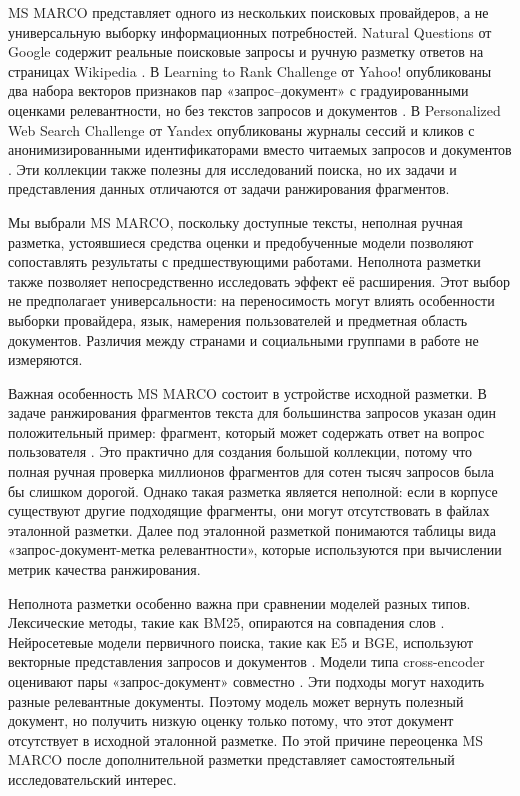 \documentclass[runningheads,a4paper]{llncs}
\begin{document}
MS MARCO представляет одного из нескольких поисковых провайдеров, а не универсальную выборку информационных потребностей. Natural Questions от Google содержит реальные поисковые запросы и ручную разметку ответов на страницах Wikipedia \cite{kwiatkowski2019naturalquestions}. В Learning to Rank Challenge от Yahoo! опубликованы два набора векторов признаков пар «запрос--документ» с градуированными оценками релевантности, но без текстов запросов и документов \cite{chapelle2011yahoo}. В Personalized Web Search Challenge от Yandex опубликованы журналы сессий и кликов с анонимизированными идентификаторами вместо читаемых запросов и документов \cite{yandex2013personalized}. Эти коллекции также полезны для исследований поиска, но их задачи и представления данных отличаются от задачи ранжирования фрагментов.

Мы выбрали MS MARCO, поскольку доступные тексты, неполная ручная разметка, устоявшиеся средства оценки и предобученные модели позволяют сопоставлять результаты с предшествующими работами. Неполнота разметки также позволяет непосредственно исследовать эффект её расширения. Этот выбор не предполагает универсальности: на переносимость могут влиять особенности выборки провайдера, язык, намерения пользователей и предметная область документов. Различия между странами и социальными группами в работе не измеряются.

Важная особенность MS MARCO состоит в устройстве исходной разметки. В задаче ранжирования фрагментов текста для большинства запросов указан один положительный пример: фрагмент, который может содержать ответ на вопрос пользователя \cite{msmarco_datasets}. Это практично для создания большой коллекции, потому что полная ручная проверка миллионов фрагментов для сотен тысяч запросов была бы слишком дорогой. Однако такая разметка является неполной: если в корпусе существуют другие подходящие фрагменты, они могут отсутствовать в файлах эталонной разметки. Далее под эталонной разметкой понимаются таблицы вида «запрос-документ-метка релевантности», которые используются при вычислении метрик качества ранжирования.

Неполнота разметки особенно важна при сравнении моделей разных типов. Лексические методы, такие как BM25, опираются на совпадения слов \cite{robertson2009bm25}. Нейросетевые модели первичного поиска, такие как E5 и BGE, используют векторные представления запросов и документов \cite{wang2022e5,xiao2023cpack}. Модели типа cross-encoder оценивают пары «запрос-документ» совместно \cite{nogueira2019bert}. Эти подходы могут находить разные релевантные документы. Поэтому модель может вернуть полезный документ, но получить низкую оценку только потому, что этот документ отсутствует в исходной эталонной разметке. По этой причине переоценка MS MARCO после дополнительной разметки представляет самостоятельный исследовательский интерес.
\end{document}
